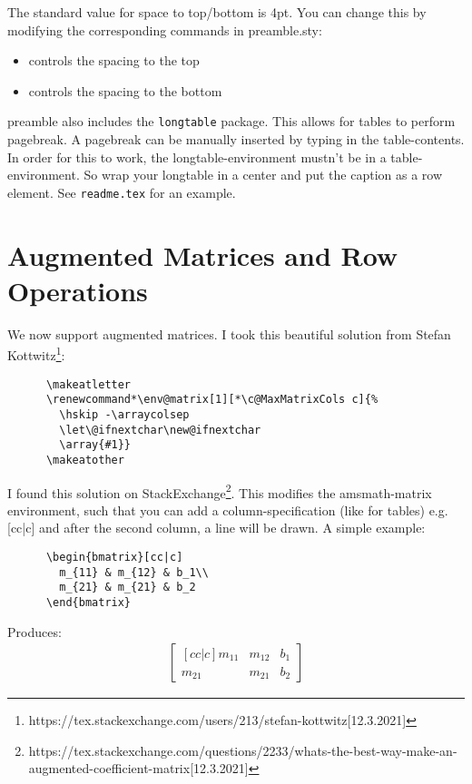 \documentclass{article}
\begin{document}
    The standard value for space to top/bottom is 4pt. You can change this by modifying the corresponding commands
    in preamble.sty:
    \begin{itemize}
      \item \texttt{\setlength\cellspacetopline}  controls the spacing to the top
      \item \texttt{\setlength\cellspacebottomline} controls the spacing to the bottom
    \end{itemize}

    preamble also includes the \texttt{longtable} package. This allows for tables to perform pagebreak. A
    pagebreak can be manually inserted by typing \texttt{\pagebreak} in the table-contents. In order for
    this to work, the longtable-environment mustn't be in a table-environment. So wrap your longtable in
    a center and put the caption as a row element. See \texttt{readme.tex} for an example.
  \newpage
  \section{Augmented Matrices and Row Operations}
    We now support augmented matrices. I took this beautiful solution from 
    Stefan Kottwitz\footnote{https://tex.stackexchange.com/users/213/stefan-kottwitz[12.3.2021]}:
    \begin{verbatim}
      \makeatletter                                      
      \renewcommand*\env@matrix[1][*\c@MaxMatrixCols c]{%
        \hskip -\arraycolsep                             
        \let\@ifnextchar\new@ifnextchar                  
        \array{#1}}                                      
      \makeatother                                       
    \end{verbatim}
    I found this solution on 
    StackExchange\footnote{https://tex.stackexchange.com/questions/2233/whats-the-best-way-make-an-augmented-coefficient-matrix[12.3.2021]}. 
    This modifies the amsmath-matrix environment, such that you can add a column-specification (like for tables) e.g.
    [cc|c] and after the second column, a line will be drawn. A simple example:
    \begin{verbatim}
      \begin{bmatrix}[cc|c]
        m_{11} & m_{12} & b_1\\
        m_{21} & m_{21} & b_2
      \end{bmatrix}
    \end{verbatim}
    Produces:
    \begin{align*}
      \begin{bmatrix}[cc|c]
        m_{11} & m_{12} & b_1\\
        m_{21} & m_{21} & b_2
      \end{bmatrix}
    \end{align*}
\end{document}

